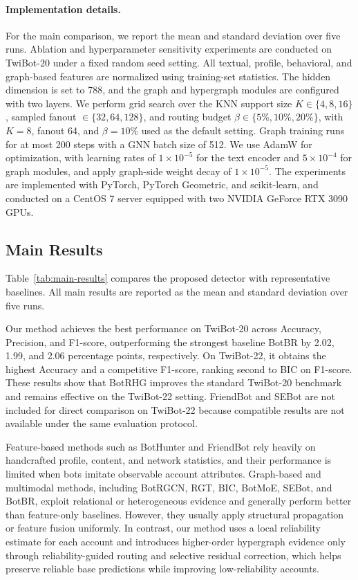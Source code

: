 \paragraph{Implementation details.}
For the main comparison, we report the mean and standard deviation over five runs. Ablation and hyperparameter sensitivity experiments are conducted on TwiBot-20 under a fixed random seed setting. All textual, profile, behavioral, and graph-based features are normalized using training-set statistics. The hidden dimension is set to 788, and the graph and hypergraph modules are configured with two layers. We perform grid search over the KNN support size $K \in \{4,8,16\}$, sampled fanout $\in \{32,64,128\}$, and routing budget $\beta \in \{5\%,10\%,20\%\}$, with $K=8$, fanout 64, and $\beta=10\%$ used as the default setting. Graph training runs for at most 200 steps with a GNN batch size of 512. We use AdamW for optimization, with learning rates of $1\times10^{-5}$ for the text encoder and $5\times10^{-4}$ for graph modules, and apply graph-side weight decay of $1\times10^{-5}$. The experiments are implemented with PyTorch, PyTorch Geometric, and scikit-learn, and conducted on a CentOS 7 server equipped with two NVIDIA GeForce RTX 3090 GPUs.

\subsection{Main Results}

Table~\ref{tab:main-results} compares the proposed detector with representative baselines. All main results are reported as the mean and standard deviation over five runs.



Our method achieves the best performance on TwiBot-20 across Accuracy, Precision, and F1-score, outperforming the strongest baseline BotBR by 2.02, 1.99, and 2.06 percentage points, respectively. On TwiBot-22, it obtains the highest Accuracy and a competitive F1-score, ranking second to BIC on F1-score. These results show that BotRHG improves the standard TwiBot-20 benchmark and remains effective on the TwiBot-22 setting. FriendBot and SEBot are not included for direct comparison on TwiBot-22 because compatible results are not available under the same evaluation protocol.

Feature-based methods such as BotHunter and FriendBot rely heavily on handcrafted profile, content, and network statistics, and their performance is limited when bots imitate observable account attributes. Graph-based and multimodal methods, including BotRGCN, RGT, BIC, BotMoE, SEBot, and BotBR, exploit relational or heterogeneous evidence and generally perform better than feature-only baselines. However, they usually apply structural propagation or feature fusion uniformly. In contrast, our method uses a local reliability estimate for each account and introduces higher-order hypergraph evidence only through reliability-guided routing and selective residual correction, which helps preserve reliable base predictions while improving low-reliability accounts.

